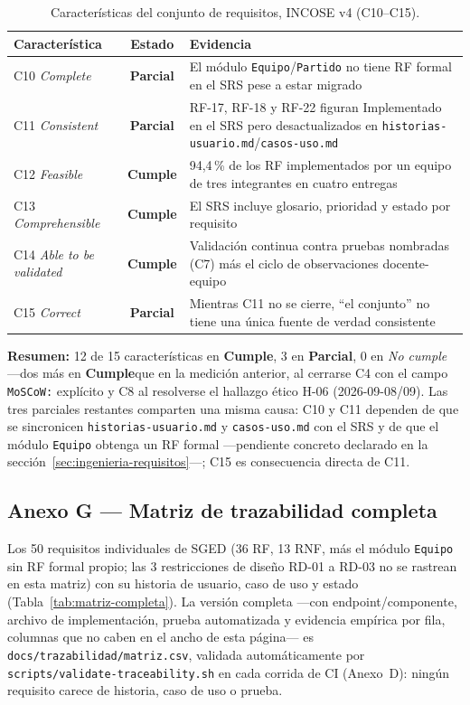 \documentclass[11pt,a4paper]{article}
\newcommand{\ruta}[1]{\texttt{\footnotesize #1}}
\newcommand{\cumple}{\textcolor{okverde}{\textbf{Cumple}}}
\newcommand{\parcial}{\textcolor{alerta}{\textbf{Parcial}}}
\begin{document}
\begin{table}[htbp]
\centering
\scriptsize
\caption{Características del conjunto de requisitos, INCOSE v4 (C10--C15).}
\label{tab:incose-conjunto}
\begin{tabular}{@{}p{3.6cm}cp{8.5cm}@{}}
\toprule
\textbf{Característica} & \textbf{Estado} & \textbf{Evidencia} \\
\midrule
C10 \emph{Complete} & \parcial & El módulo \texttt{Equipo}/\texttt{Partido} no tiene RF formal en el SRS pese a estar migrado \\
C11 \emph{Consistent} & \parcial & RF-17, RF-18 y RF-22 figuran Implementado en el SRS pero desactualizados en \ruta{historias-usuario.md}/\ruta{casos-uso.md} \\
C12 \emph{Feasible} & \cumple & 94,4\,\% de los RF implementados por un equipo de tres integrantes en cuatro entregas \\
C13 \emph{Comprehensible} & \cumple & El SRS incluye glosario, prioridad y estado por requisito \\
C14 \emph{Able to be validated} & \cumple & Validación continua contra pruebas nombradas (C7) más el ciclo de observaciones docente-equipo \\
C15 \emph{Correct} & \parcial & Mientras C11 no se cierre, ``el conjunto'' no tiene una única fuente de verdad consistente \\
\bottomrule
\end{tabular}
\end{table}

\textbf{Resumen:} 12 de 15 características en \cumple, 3 en \parcial,
0 en \emph{No cumple} —dos más en \cumple que en la medición anterior,
al cerrarse C4 con el campo \texttt{MoSCoW:} explícito y C8 al resolverse
el hallazgo ético H-06 (2026-09-08/09). Las tres parciales restantes
comparten una misma causa: C10 y C11 dependen de que se sincronicen
\ruta{historias-usuario.md} y \ruta{casos-uso.md} con el SRS y de que el
módulo \texttt{Equipo} obtenga un RF formal —pendiente concreto
declarado en la sección~\ref{sec:ingenieria-requisitos}—; C15 es
consecuencia directa de C11.

\subsection*{Anexo G --- Matriz de trazabilidad completa}

Los 50 requisitos individuales de SGED (36 RF, 13 RNF, más el módulo
\texttt{Equipo} sin RF formal propio; las 3 restricciones de diseño
RD-01 a RD-03 no se rastrean en esta matriz) con su historia de usuario,
caso de uso y estado (Tabla~\ref{tab:matriz-completa}). La versión
completa —con endpoint/componente,
archivo de implementación, prueba automatizada y evidencia empírica
por fila, columnas que no caben en el ancho de esta página— es
\ruta{docs/trazabilidad/matriz.csv}, validada automáticamente por
\ruta{scripts/validate-traceability.sh} en cada corrida de CI
(Anexo~D): ningún requisito carece de historia, caso de uso o prueba.
\end{document}
